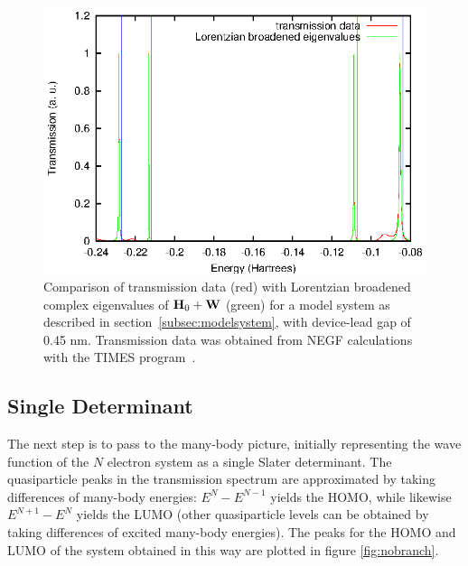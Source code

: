 \begin{figure}
	\begin{center}
		\includegraphics[width=0.9\linewidth]{figures/4evals}
	\end{center}
	\caption{Comparison of transmission data (red) with Lorentzian
	broadened complex eigenvalues of $\mathbf{H}_0 + \mathbf{W}$ (green) for a
	model system as described in section~\ref{subsec:modelsystem}, with
	device-lead gap of 0.45 nm. Transmission data was obtained from
	\ac{NEGF} calculations with the TIMES program~\cite{times}.}
	\label{fig:lobro-hwevals}
\end{figure}

\subsection{Single Determinant}
\label{subsec:SingleDeterminant}

The next step is to pass to the many-body picture, initially representing the
wave function of the $N$ electron system as a single Slater determinant. The
quasiparticle peaks in the transmission spectrum are approximated by taking
differences of many-body energies: $E^N - E^{N-1}$ yields the \ac{HOMO}, while
likewise $E^{N+1} - E^N$ yields the \ac{LUMO} (other quasiparticle levels can be
obtained by taking differences of excited many-body energies). The peaks for
the \ac{HOMO} and \ac{LUMO} of the system obtained in this way are plotted in figure
\ref{fig:nobranch}.

